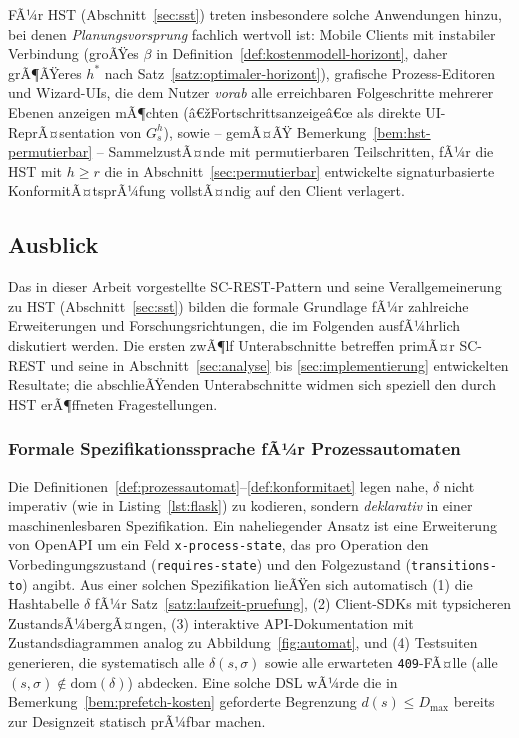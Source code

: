 ﻿\documentclass[a4paper,12pt]{article}
\theoremstyle{definition}
\begin{document}
FÃ¼r HST (Abschnitt~\ref{sec:sst}) treten insbesondere solche Anwendungen hinzu, bei denen
\emph{Planungsvorsprung} fachlich wertvoll ist: Mobile Clients mit instabiler Verbindung
(groÃŸes $\beta$ in Definition~\ref{def:kostenmodell-horizont}, daher grÃ¶ÃŸeres $h^\ast$
nach Satz~\ref{satz:optimaler-horizont}), grafische Prozess-Editoren und Wizard-UIs, die
dem Nutzer \emph{vorab} alle erreichbaren Folgeschritte mehrerer Ebenen anzeigen mÃ¶chten
(â€žFortschrittsanzeigeâ€œ als direkte UI-ReprÃ¤sentation von $G_s^h$), sowie -- gemÃ¤ÃŸ
Bemerkung~\ref{bem:hst-permutierbar} -- SammelzustÃ¤nde mit permutierbaren Teilschritten,
fÃ¼r die HST mit $h\ge r$ die in Abschnitt~\ref{sec:permutierbar} entwickelte
signaturbasierte KonformitÃ¤tsprÃ¼fung vollstÃ¤ndig auf den Client verlagert.

\subsection{Ausblick}
\label{sec:ausblick}

Das in dieser Arbeit vorgestellte SC-REST-Pattern und seine Verallgemeinerung zu HST
(Abschnitt~\ref{sec:sst}) bilden die formale Grundlage fÃ¼r zahlreiche Erweiterungen und
Forschungsrichtungen, die im Folgenden ausfÃ¼hrlich diskutiert werden. Die ersten zwÃ¶lf
Unterabschnitte betreffen primÃ¤r SC-REST und seine in Abschnitt~\ref{sec:analyse} bis
\ref{sec:implementierung} entwickelten Resultate; die abschlieÃŸenden Unterabschnitte
widmen sich speziell den durch HST erÃ¶ffneten Fragestellungen.

\subsubsection{Formale Spezifikationssprache fÃ¼r Prozessautomaten}

Die Definitionen~\ref{def:prozessautomat}--\ref{def:konformitaet} legen nahe, $\delta$
nicht imperativ (wie in Listing~\ref{lst:flask}) zu kodieren, sondern \emph{deklarativ} in
einer maschinenlesbaren Spezifikation. Ein naheliegender Ansatz ist eine Erweiterung von
OpenAPI um ein Feld \texttt{x-process-state}, das pro Operation den Vorbedingungszustand
(\texttt{requires-state}) und den Folgezustand (\texttt{transitions-to}) angibt. Aus einer
solchen Spezifikation lieÃŸen sich automatisch (1) die Hashtabelle $\delta$ fÃ¼r
Satz~\ref{satz:laufzeit-pruefung}, (2) Client-SDKs mit typsicheren ZustandsÃ¼bergÃ¤ngen, (3)
interaktive API-Dokumentation mit Zustandsdiagrammen analog zu
Abbildung~\ref{fig:automat}, und (4) Testsuiten generieren, die systematisch alle
$\delta(s,\sigma)$ sowie alle erwarteten \texttt{409}-FÃ¤lle (alle $(s,\sigma)\notin
\mathrm{dom}(\delta)$) abdecken. Eine solche DSL wÃ¼rde die in
Bemerkung~\ref{bem:prefetch-kosten} geforderte Begrenzung $d(s)\leq D_{\max}$ bereits zur
Designzeit statisch prÃ¼fbar machen.
\end{document}
